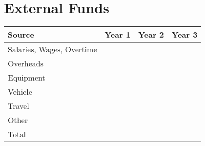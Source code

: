 \documentclass[version=last,
    paper=a4, %
    10pt, %
    usenames,
    dvipsnames,
    oneside, %
    headings=openany, %
    DIV=15 %
]{scrbook}
\begin{document}
\section*{External Funds }



\begin{longtabu} to \linewidth { |  X | X | X | X | }
\hline
{}
Source & Year 1 & Year 2 & Year 3\\
\hline
\endhead



Salaries, Wages, Overtime &  &  & \\



Overheads &  &  & \\



Equipment &  &  & \\



Vehicle &  &  & \\



Travel &  &  & \\



Other &  &  & \\



Total &  &  & \\


\hline
\end{longtabu}





\end{document}
